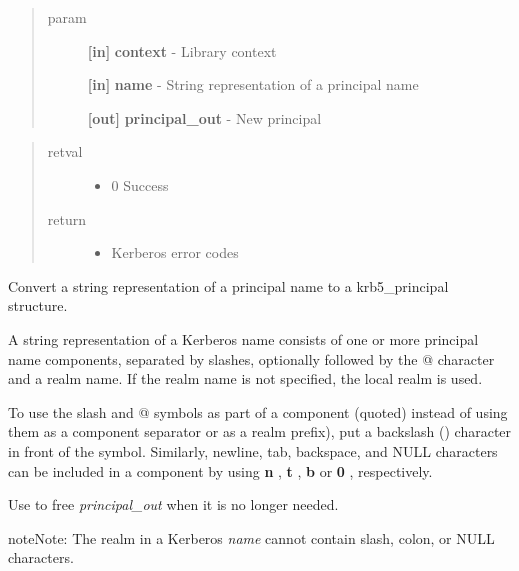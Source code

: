 \documentclass[letterpaper,10pt,english]{sphinxmanual}
\begin{document}
\begin{quote}\begin{description}
\item[{param}] \leavevmode
\textbf{{[}in{]}} \textbf{context} - Library context

\textbf{{[}in{]}} \textbf{name} - String representation of a principal name

\textbf{{[}out{]}} \textbf{principal\_out} - New principal

\end{description}\end{quote}
\begin{quote}\begin{description}
\item[{retval}] \leavevmode\begin{itemize}
\item {} 
0   Success

\end{itemize}

\item[{return}] \leavevmode\begin{itemize}
\item {} 
Kerberos error codes

\end{itemize}

\end{description}\end{quote}

Convert a string representation of a principal name to a krb5\_principal structure.

A string representation of a Kerberos name consists of one or more principal name components, separated by slashes, optionally followed by the @ character and a realm name. If the realm name is not specified, the local realm is used.

To use the slash and @ symbols as part of a component (quoted) instead of using them as a component separator or as a realm prefix), put a backslash () character in front of the symbol. Similarly, newline, tab, backspace, and NULL characters can be included in a component by using \textbf{n} , \textbf{t} , \textbf{b} or \textbf{0} , respectively.

Use {\hyperref[appdev/refs/api/krb5_free_principal:c.krb5_free_principal]{}} to free \emph{principal\_out} when it is no longer needed.

\begin{notice}{note}{Note:}
The realm in a Kerberos \emph{name} cannot contain slash, colon, or NULL characters.
\end{notice}
\end{document}
